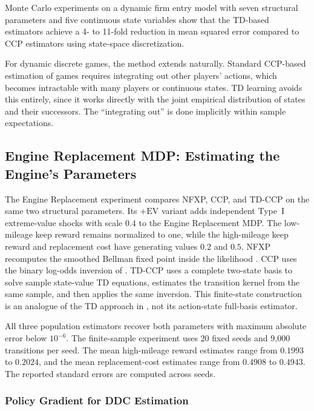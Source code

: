 Monte Carlo experiments on a dynamic firm entry model with seven structural parameters and five continuous state variables show that the TD-based estimators achieve a 4- to 11-fold reduction in mean squared error compared to CCP estimators using state-space discretization.

For dynamic discrete games, the method extends naturally. Standard CCP-based estimation of games requires integrating out other players' actions, which becomes intractable with many players or continuous states. TD learning avoids this entirely, since it works directly with the joint empirical distribution of states and their successors. The ``integrating out'' is done implicitly within sample expectations.

\FloatBarrier
\subsection{Engine Replacement MDP: Estimating the Engine's Parameters}
\label{engine:ch05}



The Engine Replacement experiment compares NFXP, CCP, and TD-CCP on the same two structural parameters. Its $+\mathrm{EV}$ variant adds independent Type~I extreme-value shocks with scale $0.4$ to the Engine Replacement MDP. The low-mileage keep reward remains normalized to one, while the high-mileage keep reward and replacement cost have generating values $0.2$ and $0.5$. NFXP recomputes the smoothed Bellman fixed point inside the likelihood \citep{Rust1987}. CCP uses the binary log-odds inversion of \citet{HotzMiller1993}. TD-CCP uses a complete two-state basis to solve sample state-value TD equations, estimates the transition kernel from the same sample, and then applies the same inversion. This finite-state construction is an analogue of the TD approach in \citet{AdusumilliEckardt2022}, not its action-state full-basis estimator.

All three population estimators recover both parameters with maximum absolute error below $10^{-6}$. The finite-sample experiment uses 20 fixed seeds and 9,000 transitions per seed. The mean high-mileage reward estimates range from $0.1993$ to $0.2024$, and the mean replacement-cost estimates range from $0.4908$ to $0.4943$. The reported standard errors are computed across seeds.
\FloatBarrier


\subsubsection{Policy Gradient for DDC Estimation}

